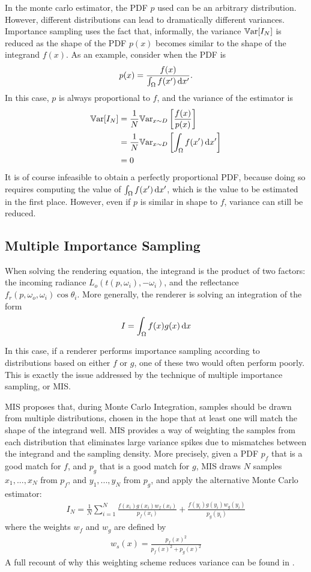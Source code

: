 In the monte carlo estimator, the PDF $p$ used can be an arbitrary distribution. However, different distributions can lead to dramatically different variances. Importance sampling uses the fact that, informally, the variance $\mathbb{V}\text{ar}[I_N]$ is reduced as the shape of the PDF $p(x)$ becomes similar to the shape of the integrand $f(x)$. As an example, consider when the PDF is 
$$ 
p(x)=\frac{f(x)}{\int_\Omega f(x') \,\mathrm{d} x'}.
$$ 
In this case, $p$ is always proportional to $f$, and the variance of the estimator is
\begin{align*}
\mathbb{V}\text{ar}[I_N]
&= \frac{1}{N}\mathbb{V}\text{ar}_{x\sim D}\left[\frac{f(x)}{p(x)}\right]\\
&= \frac{1}{N}\mathbb{V}\text{ar}_{x\sim D}\left[\int_\Omega f(x') \,\mathrm{d} x'\right]\\
&=0
\end{align*}
It is of course infeasible to obtain a perfectly proportional PDF, because doing so requires computing the value of $\int_\Omega f(x') \,\mathrm{d} x'$, which is the value to be estimated in the first place. However, even if $p$ is similar in shape to $f$, variance can still be reduced.

\subsection{Multiple Importance Sampling}
\label{subsection MIS}
When solving the rendering equation, the integrand is the product of two factors: the incoming radiance $L_o(t(p,\omega_i),-\omega_i)$, and the reflectance $f_r(p,\omega_o,\omega_i)\cos\theta_i$. More generally, the renderer is solving an integration of the form
$$
I = \int_\Omega f(x)g(x)\,\mathrm{d} x
$$

In this case, if a renderer performs importance sampling according to distributions based on either $f$ or $g$, one of these two would often perform poorly\cite{pharr2016physically}. This is exactly the issue addressed by the technique of multiple importance sampling, or MIS.

MIS proposes that, during Monte Carlo Integration, samples should be drawn from multiple distributions, chosen in the hope that at least one will match the shape of the integrand well. MIS provides a way of weighting the samples from each distribution that eliminates large variance spikes due to mismatches between the integrand and the sampling density. More precisely, given a PDF $p_f$ that is a good match for $f$, and $p_g$ that is a good match for $g$, MIS draws $N$ samples $x_1,...,x_N$ from $p_f$, and $y_1,...,y_N$ from $p_g$, and apply the alternative Monte Carlo estimator:
\begin{align}
    I_N = \frac{1}{N} \sum_{i=1}^{N} \frac{f(x_i)g(x_i)w_f(x_i)}{p_f(x_i)} + \frac{f(y_i)g(y_i)w_g(y_i)}{p_g(y_i)}
    \label{MIS}
\end{align}
where the weights $w_f$ and $w_g$ are defined by
\begin{align*}
    w_s(x) = \frac{p_f(x)^2}{p_f(x)^2+p_g(x)^2}
\end{align*}
A full recount of why this weighting scheme reduces variance can be found in \cite{pharr2016physically}. 

